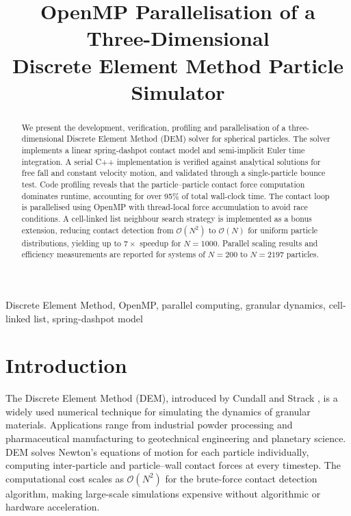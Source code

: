 \documentclass[conference]{IEEEtran}
\begin{document}
	
	\title{OpenMP Parallelisation of a Three-Dimensional\\
		Discrete Element Method Particle Simulator}
	
	\author{
	}
	
	\maketitle
	
	\begin{abstract}
		We present the development, verification, profiling and parallelisation of a
		three-dimensional Discrete Element Method (DEM) solver for spherical particles.
		The solver implements a linear spring-dashpot contact model and semi-implicit
		Euler time integration. A serial C++ implementation is verified against
		analytical solutions for free fall and constant velocity motion, and validated
		through a single-particle bounce test. Code profiling reveals that the
		particle--particle contact force computation dominates runtime, accounting for
		over 95\% of total wall-clock time. The contact loop is parallelised using
		OpenMP with thread-local force accumulation to avoid race conditions. A
		cell-linked list neighbour search strategy is implemented as a bonus extension,
		reducing contact detection from $\mathcal{O}(N^2)$ to $\mathcal{O}(N)$ for
		uniform particle distributions, yielding up to $7\times$ speedup for
		$N=1000$. Parallel scaling results and efficiency measurements are reported for
		systems of $N = 200$ to $N = 2197$ particles.
	\end{abstract}
	
	\begin{IEEEkeywords}
		Discrete Element Method, OpenMP, parallel computing, granular dynamics,
		cell-linked list, spring-dashpot model
	\end{IEEEkeywords}
	
	\section{Introduction}
	
	The Discrete Element Method (DEM), introduced by Cundall and Strack
	\cite{cundall1979}, is a widely used numerical technique for simulating the
	dynamics of granular materials. Applications range from industrial powder
	processing and pharmaceutical manufacturing to geotechnical engineering and
	planetary science. DEM solves Newton's equations of motion for each particle
	individually, computing inter-particle and particle--wall contact forces at
	every timestep. The computational cost scales as $\mathcal{O}(N^2)$ for the
	brute-force contact detection algorithm, making large-scale simulations
	expensive without algorithmic or hardware acceleration.
	
\end{document}
